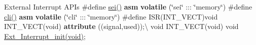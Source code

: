 External Interrupt APIs \#define \mbox{\hyperlink{external__interrupt_8h_aad5ebd34cb344c26ac87594f79b06b73}{sei()}} {\bfseries{asm}} {\bfseries{volatile}} (\char`\"{}sei\char`\"{} \+::\+: \char`\"{}memory\char`\"{}) \#define \mbox{\hyperlink{external__interrupt_8h_a68c330e94fe121eba993e5a5973c3162}{cli()}} {\bfseries{asm}} {\bfseries{volatile}} (\char`\"{}cli\char`\"{} \+::\+: \char`\"{}memory\char`\"{}) \#define ISR(\+INT\+\_\+\+VECT)void INT\+\_\+\+VECT(void) {\bfseries{attribute}} ((signal,used));\textbackslash{} void INT\+\_\+\+VECT(void) void \mbox{\hyperlink{external__interrupt_8c_a3dec38d0979b192185103ac2ac7e21a7}{Ext\+\_\+\+Interrupt\+\_\+init(void)}}; 